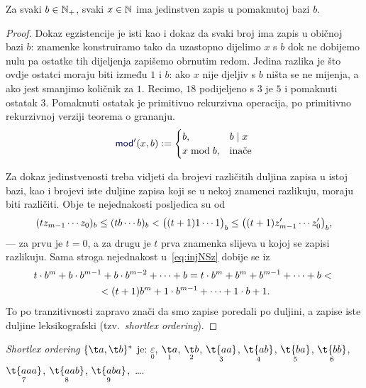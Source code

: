 \begin{lema}[{name=[egzistencija i jedinstvenost zapisa u pomaknutoj bazi]}]\label{lm:pomakbaza}
Za svaki $b\in{\mathbb N}_+$, svaki $x\in{\mathbb N}$ ima jedinstven zapis u pomaknutoj bazi $b$.
\end{lema}
\begin{proof}
Dokaz egzistencije je isti kao i dokaz da svaki broj ima zapis u običnoj bazi $b$: znamenke konstruiramo tako da uzastopno dijelimo $x$ s $b$ dok ne dobijemo nulu pa ostatke tih dijeljenja zapišemo obrnutim redom. Jedina razlika je što ovdje ostatci moraju biti između $1$ i $b$: ako $x$ nije djeljiv s $b$ ništa se ne mijenja, a ako jest smanjimo količnik za $1$. Recimo, $18$ podijeljeno s $3$ je $5$ i pomaknuti ostatak $3$. Pomaknuti ostatak je primitivno rekurzivna operacija, po primitivno rekurzivnoj verziji teorema o grananju.
\begin{equation}
    \f{mod}'(x,b):=\begin{cases}
        b,&b\mid x\\
        x\bmod b,&\text{inače}
    \end{cases}
\end{equation}

Za dokaz jedinstvenosti treba vidjeti da brojevi različitih duljina zapisa u istoj bazi, kao i brojevi iste duljine zapisa koji se u nekoj znamenci razlikuju, moraju biti različiti. Obje te nejednakosti posljedica su od
\begin{equation}
\label{eq:injNSz}
    (tz_{m-1}\dotsm z_0)_b\le
    (tb\dotsm b)_b<
    \bigl((t+1)1\dotsm1\bigr)_b\le
    \bigl((t+1)z_{m-1}'\dotsm z_0'\bigr)_b\text,
\end{equation}
--- za prvu je $t=0$, a za drugu je $t$ prva znamenka slijeva u kojoj se zapisi razlikuju. Sama stroga nejednakost u~\eqref{eq:injNSz} dobije se iz
\begin{multline}
    t\cdot b^m+b\cdot b^{m-1}+b\cdot b^{m-2}+\dotsb+b=
    t\cdot b^m+b^m+b^{m-1}+\dotsb+b<{}\\
    {}<(t+1)b^m+1\cdot b^{m-1}+\dotsb+1\cdot b+1\text.
\end{multline}
To po tranzitivnosti zapravo znači da smo zapise poredali po duljini, a zapise iste duljine leksikografski (tzv.\ \emph{shortlex ordering}).
\end{proof}

\begin{primjer}[{name=[\emph{shortlex ordering} svih riječi nad dvočlanom abecedom]}]
\emph{Shortlex ordering} $\{\t a,\t b\}^*$ je: $\underset{0}{\varepsilon}$,
$\underset{1}{\t a}$,
$\underset{2}{\t b}$,
$\underset{3}{\t{aa}}$,
$\underset{4}{\t{ab}}$,
$\underset{5}{\t{ba}}$,
$\underset{6}{\t{bb}}$,
$\underset{7}{\t{aaa}}$,
$\underset{8}{\t{aab}}$,
$\underset{9}{\t{aba}}$,~\ldots.
\end{primjer}

